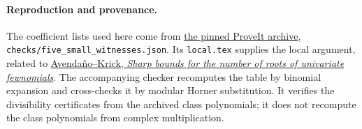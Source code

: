 \documentclass[11pt]{article}
\begin{document}
\paragraph{Reproduction and provenance.}
The coefficient lists used here come from
\href{https://github.com/VladimirReshetnikov/ProveIt/blob/48efe71a726dddc5a505534edaa4c0fd190416b9/docs/incoming/grh_sparse_singular_moduli.zip}{the pinned ProveIt archive},
\texttt{checks/five\_small\_witnesses.json}. Its \texttt{local.tex} supplies
the local argument, related to
\href{https://arxiv.org/abs/1008.4808}{Avenda\~no--Krick, \emph{Sharp bounds for the number of roots of univariate fewnomials}}.
The accompanying checker recomputes the table by binomial expansion and
cross-checks it by modular Horner substitution. It verifies the
divisibility certificates from the archived class polynomials; it does
not recompute the class polynomials from complex multiplication.
\end{document}
